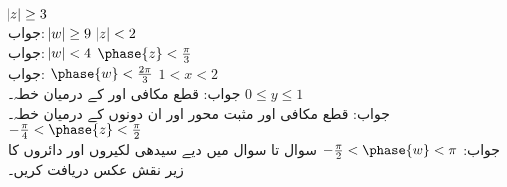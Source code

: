 \quad
$\abs{z}\ge 3$\\
جواب:\quad
$\abs{w}\ge 9$
\quad
$\abs{z}<2$\\
جواب:\quad
$\abs{w}<4$
\quad
$\phase{z}<\tfrac{\pi}{3}$\\
جواب:\quad
$\phase{w}<\tfrac{2\pi}{3}$
\quad
$1<x<2$\\
جواب:\quad
قطع مکافی  اور  کے درمیان خطہ۔
\quad
$0\le y\le 1$\\
جواب:\quad
قطع مکافی  اور مثبت  محور اور ان دونوں کے درمیان خطہ۔
\quad
$-\tfrac{\pi}{4}< \phase{z}<\tfrac{\pi}{2}$\\
جواب:\quad
$-\tfrac{\pi}{2}<\phase{w}<\pi$
سوال  تا سوال  میں دیے سیدھی لکیروں اور دائروں کا زیر نقش  عکس دریافت کریں۔
 
